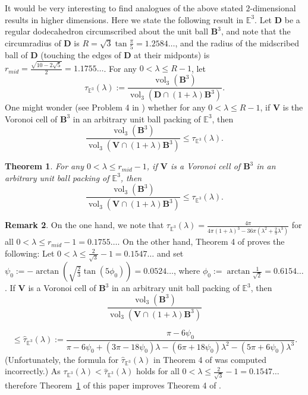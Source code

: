 \documentclass[11pt]{amsart}
\DeclareMathOperator{\vol}{vol}
\newcommand{\Eu}{\mathbb{E}}
\newcommand{\BB}{\mathbf{B}}
\newcommand{\VV}{\mathbf{V}}
\newcommand{\DD}{\mathbf{D}}
\newtheorem{theorem}{Theorem}[section]
\theoremstyle{definition}
\newtheorem{remark}[theorem]{Remark}
\numberwithin{equation}{section}
\begin{document}
It would be very interesting to find analogues of the above stated $2$-dimensional results in higher dimensions. Here we state the following result in $\Eu^3$. Let $\DD$ be a regular dodecahedron circumscribed about the unit ball $\BB^3$, and note that the circumradius of $\DD$ is $R = \sqrt{3} \tan \frac{\pi}{5} = 1.2584\ldots$, and the radius of the midscribed ball of $\DD$ (touching the edges of $\DD$ at their midponts) is $r_{mid} = \frac{\sqrt{10-2\sqrt{5}}}{2} = 1.1755\ldots$.
For any $0 < \lambda \leq R-1$, let
\[
\tau_{\Eu^3}(\lambda) := \frac{\vol_3(\BB^3)}{\vol_3(\DD \cap (1+\lambda) \BB^3)}.
\]
One might wonder (see Problem 4 in \cite{Be-La-2015}) whether for any $0 < \lambda \leq R-1$, if $\VV$ is the Voronoi cell of $\BB^3$ in an arbitrary unit ball packing of $\Eu^3$, then
\[
\frac{\vol_{3}(\BB^3)}{\vol_3(\VV \cap (1+\lambda) \BB^3)} \leq \tau_{\Eu^3}(\lambda).
\]

\begin{theorem}\label{truncated dodecahedron}
For any $0 < \lambda \leq r_{mid}-1$, if $\VV$ is a Voronoi cell of $\BB^3$ in an arbitrary unit ball packing of $\Eu^3$, then
\[
\frac{\vol_3(\BB^3)}{\vol_3( \VV \cap (1+\lambda) \BB^3)} \leq \tau_{\Eu^3}(\lambda).
\]
\end{theorem}

\begin{remark}
On the one hand, we note that $\tau_{\Eu^3}(\lambda)=\frac{4\pi}{4\pi(1+\lambda)^3-36\pi(\lambda^2+\frac{2}{3}\lambda^3)}$ for all $0 < \lambda \leq r_{mid}-1=0.1755\dots$. On the other hand, Theorem 4 of \cite{Be-La-2015} proves the following: Let $0<\lambda\leq\frac{2}{\sqrt{3}}-1=0.1547\dots$ and set $\psi_0:=-\arctan\left(\sqrt{\frac{2}{3}}\tan(5\phi_0)\right)=0.0524\dots$, where $\phi_0:=\arctan\frac{1}{\sqrt{2}}=0.6154\dots$. If $\VV$ is a Voronoi cell of $\BB^3$ in an arbitrary unit ball packing of $\Eu^3$, then
\[
\frac{\vol_3(\BB^3)}{\vol_3(\VV \cap (1+\lambda) \BB^3)}
\] 

\[
\leq  \hat{\tau}_{\Eu^3}(\lambda):=\frac{\pi-6\psi_0}{\pi-6\psi_0+(3\pi-18\psi_0)\lambda-(6\pi+18\psi_0)\lambda^2-(5\pi+6\psi_0)\lambda^3}.
\]
(Unfortunately, the formula for $\hat{\tau}_{\Eu^3}(\lambda)$ in Theorem 4 of \cite{Be-La-2015} was computed incorrectly.) As $ \tau_{\Eu^3}(\lambda)<\hat{\tau}_{\Eu^3}(\lambda)$ holds for all $0<\lambda\leq\frac{2}{\sqrt{3}}-1=0.1547\dots$ therefore Theorem~\ref{truncated dodecahedron} of this paper improves Theorem 4 of \cite{Be-La-2015}.
\end{remark}
\end{document}
